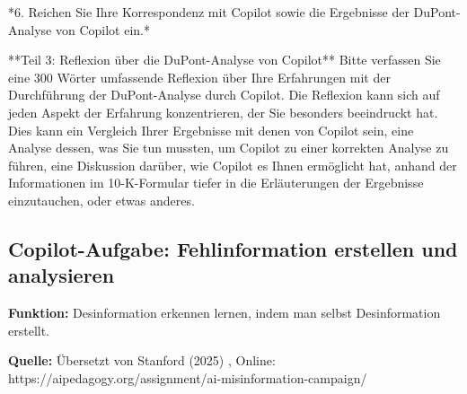 \documentclass[
  ngerman,
  letterpaper,
  DIV=11]{scrreprt}
\newenvironment{Shaded}{\begin{snugshade}}{\end{snugshade}}
\newcommand{\NormalTok}[1]{\textcolor[rgb]{0.00,0.23,0.31}{#1}}
\begin{document}
\begin{tcolorbox}
\begin{Shaded}
\begin{Highlighting}[]
\NormalTok{*6. Reichen Sie Ihre Korrespondenz mit Copilot sowie die Ergebnisse der DuPont{-}Analyse von Copilot ein.*}

\NormalTok{**Teil 3: Reflexion über die DuPont{-}Analyse von Copilot**}
\NormalTok{Bitte verfassen Sie eine 300 Wörter umfassende Reflexion über Ihre Erfahrungen mit der Durchführung der DuPont{-}Analyse durch Copilot.}
\NormalTok{Die Reflexion kann sich auf jeden Aspekt der Erfahrung konzentrieren, der Sie besonders beeindruckt hat. Dies kann ein Vergleich Ihrer Ergebnisse mit denen von Copilot sein, eine Analyse dessen, was Sie tun mussten, um Copilot zu einer korrekten Analyse zu führen, eine Diskussion darüber, wie Copilot es Ihnen ermöglicht hat, anhand der Informationen im 10{-}K{-}Formular tiefer in die Erläuterungen der Ergebnisse einzutauchen, oder etwas anderes.}
\end{Highlighting}
\end{Shaded}

\end{tcolorbox}

\subsection{Copilot-Aufgabe: Fehlinformation erstellen und
analysieren}\label{sec-prompt-desinformation}

\textbf{Funktion:} Desinformation erkennen lernen, indem man selbst
Desinformation erstellt.

\textbf{Quelle:} Übersetzt von Stanford (2025) , Online:
https://aipedagogy.org/assignment/ai-misinformation-campaign/
\end{document}

